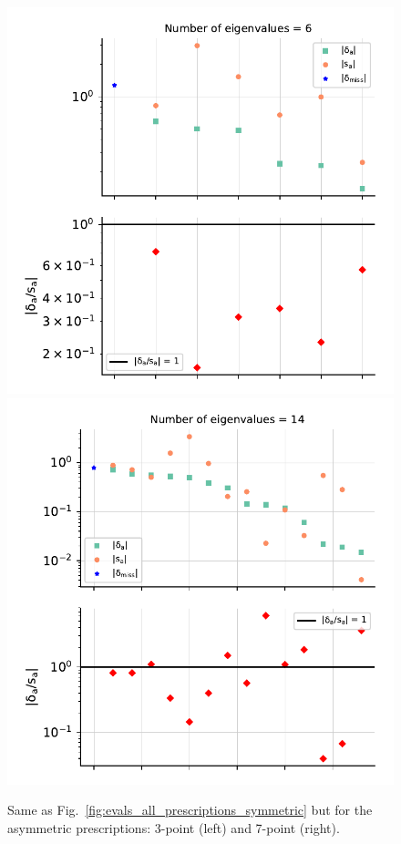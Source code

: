 \begin{figure}[ht!]
  \begin{center}
    \includegraphics[scale=0.6]{mhous/plots/projector_eigenvalue_ratio_3pt_global.pdf}
    \includegraphics[scale=0.6]{mhous/plots/projector_eigenvalue_ratio_7pt_global.pdf}
    \caption{\small Same as Fig.~\ref{fig:evals_all_prescriptions_symmetric} but for
    the asymmetric prescriptions: 3-point (left) and 7-point (right).}
    \label{fig:evals_all_prescriptions_asymmetric}
  \end{center}
\end{figure}

